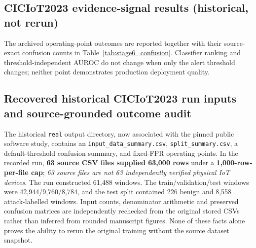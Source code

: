 \documentclass[12pt,a4paper]{article}
\begin{document}
\subsection{CICIoT2023 evidence-signal results (historical, not rerun)}
\label{sec:telemetry-results}
The archived operating-point outcomes are reported together with their source-exact confusion counts in Table~\ref{tab:stage6_confusion}. Classifier ranking and threshold-independent AUROC do not change when only the alert threshold changes; neither point demonstrates production deployment quality.

\subsection{Recovered historical CICIoT2023 run inputs and source-grounded outcome audit}
\label{sec:source-run-audit}
The historical \texttt{real} output directory, now associated with the pinned public software study, contains an \texttt{input\_data\_summary.csv}, \texttt{split\_summary.csv}, a default-threshold confusion summary, and fixed-FPR operating points. In the recorded run, \textbf{63 source CSV files supplied 63,000 rows} under a \textbf{1,000-row-per-file cap}; \emph{63 source files are not 63 independently verified physical IoT devices}. The run constructed 61,488 windows. The train/validation/test windows were 42,944/9,760/8,784, and the test split contained 226 benign and 8,558 attack-labelled windows. Input counts, denominator arithmetic and preserved confusion matrices are independently rechecked from the original stored CSVs rather than inferred from rounded manuscript figures. None of these facts alone proves the ability to rerun the original training without the source dataset snapshot.
\end{document}

